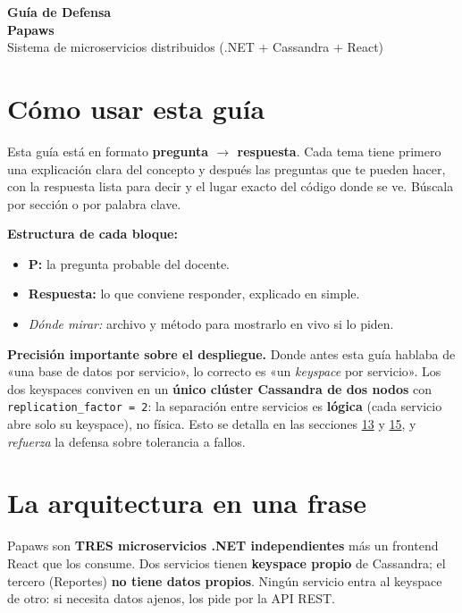 \documentclass[11pt,a4paper]{article}
\newcommand{\portada}{%
\thispagestyle{empty}
\noindent
\begin{tcolorbox}[colback=moss, colframe=moss, arc=3pt, left=14pt, right=14pt,
  top=18pt, bottom=18pt]
  {\color{white}\Huge\bfseries Guía de Defensa}\\[4pt]
  {\color{white}\LARGE\bfseries Papaws}\\[10pt]
  {\color{mosslight}\large Sistema de microservicios distribuidos (.NET + Cassandra + React)}
\end{tcolorbox}
\vspace{1.2em}
}
\begin{document}
\portada

\section*{Cómo usar esta guía}

Esta guía está en formato \textbf{pregunta $\rightarrow$ respuesta}. Cada tema tiene
primero una explicación clara del concepto y después las preguntas que te pueden
hacer, con la respuesta lista para decir y el lugar exacto del código donde se ve.
Búscala por sección o por palabra clave.

\smallskip
\noindent\textbf{Estructura de cada bloque:}
\begin{itemize}[leftmargin=1.4em, nosep]
  \item \textbf{P:} la pregunta probable del docente.
  \item \textbf{Respuesta:} lo que conviene responder, explicado en simple.
  \item \textit{Dónde mirar:} archivo y método para mostrarlo en vivo si lo piden.
\end{itemize}

\smallskip
\begin{precision}
\textbf{Precisión importante sobre el despliegue.} Donde antes esta guía hablaba de
«una base de datos por servicio», lo correcto es «un \emph{keyspace} por servicio».
Los dos keyspaces conviven en un \textbf{único clúster Cassandra de dos nodos} con
\texttt{replication\_factor~=~2}: la separación entre servicios es \textbf{lógica}
(cada servicio abre solo su keyspace), no física. Esto se detalla en las secciones
\hyperref[sec:queries]{13} y \hyperref[sec:trampa]{15}, y \emph{refuerza} la defensa
sobre tolerancia a fallos.
\end{precision}

\tableofcontents
\newpage

\section{La arquitectura en una frase}

Papaws son \textbf{TRES microservicios .NET independientes} más un frontend React
que los consume. Dos servicios tienen \textbf{keyspace propio} de Cassandra; el
tercero (Reportes) \textbf{no tiene datos propios}. Ningún servicio entra al
keyspace de otro: si necesita datos ajenos, los pide por la API REST.
\end{document}
